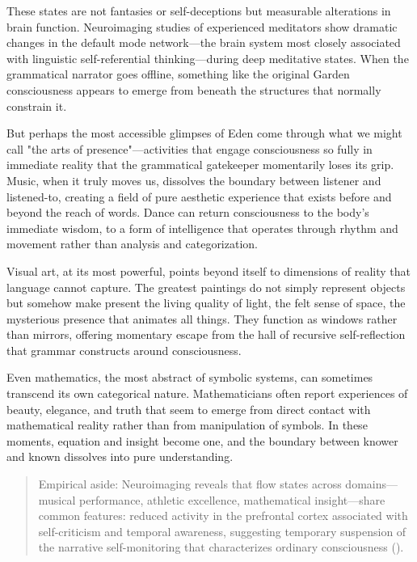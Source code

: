These states are not fantasies or self-deceptions but measurable alterations in brain function. Neuroimaging studies of experienced meditators show dramatic changes in the default mode network—the brain system most closely associated with linguistic self-referential thinking—during deep meditative states. When the grammatical narrator goes offline, something like the original Garden consciousness appears to emerge from beneath the structures that normally constrain it.

But perhaps the most accessible glimpses of Eden come through what we might call "the arts of presence"—activities that engage consciousness so fully in immediate reality that the grammatical gatekeeper momentarily loses its grip. Music, when it truly moves us, dissolves the boundary between listener and listened-to, creating a field of pure aesthetic experience that exists before and beyond the reach of words. Dance can return consciousness to the body's immediate wisdom, to a form of intelligence that operates through rhythm and movement rather than analysis and categorization.

Visual art, at its most powerful, points beyond itself to dimensions of reality that language cannot capture. The greatest paintings do not simply represent objects but somehow make present the living quality of light, the felt sense of space, the mysterious presence that animates all things. They function as windows rather than mirrors, offering momentary escape from the hall of recursive self-reflection that grammar constructs around consciousness.

Even mathematics, the most abstract of symbolic systems, can sometimes transcend its own categorical nature. Mathematicians often report experiences of beauty, elegance, and truth that seem to emerge from direct contact with mathematical reality rather than from manipulation of symbols. In these moments, equation and insight become one, and the boundary between knower and known dissolves into pure understanding.

\begin{quote}\small
Empirical aside: Neuroimaging reveals that flow states across domains—musical performance, athletic excellence, mathematical insight—share common features: reduced activity in the prefrontal cortex associated with self-criticism and temporal awareness, suggesting temporary suspension of the narrative self-monitoring that characterizes ordinary consciousness (\parencite{dietrich2004neurocognitive,limb2008neural}).
\end{quote}

